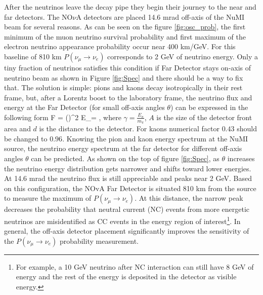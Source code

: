 After the neutrinos leave the decay pipe they begin their journey to the near and far detectors.
The NO$\nu$A detectors are placed 14.6 mrad off-axis of the NuMI beam for several reasons. As can
be seen on the figure \ref{fig:osc_prob}, the first minimum of the muon neutrino survival
probability and first maximum of the electron neutrino appearance probability occur near 400 km/GeV. 
For this baseline of 810 km $P(\nu_\mu \rightarrow \nu_e)$ corresponds
to 2 GeV of neutrino energy. Only a tiny fraction of neutrinos satisfies this condition if Far Detector 
stays on-axis of neutrino beam as shown in Figure \ref{fig:Spec} and 
there should be a way to fix that. The solution is simple: pions and kaons decay isotropically in their 
rest frame, but, after a Lorentz boost to the laboratory frame, the neutrino flux and energy at the Far 
Detector (for small off-axis angles $\theta$) can be expressed in the following form
\be
F = \Big(\Big)^2
\ee
\be
E_\nu = ,\label{EnuvsEpi}
\ee
where $\gamma = \frac{E_\pi}{m_\pi}$, $A$ is the size of the detector front area and $d$ is 
the distance to the detector. For kaons numerical factor $0.43$ should be changed to $0.96$. 
Knowing the pion and kaon energy spectrum at the NuMI source, the neutrino energy spectrum at
the far detector for different off-axis angles $\theta$ can be predicted. As shown on the top of
figure \ref{fig:Spec}, as $\theta$ increases the neutrino energy distribution gets narrower and shifts
toward lower energies. At 14.6 mrad the neutrino flux is still appreciable and peaks near 2 GeV.
Based on this configuration, the NOvA Far Detector is situated 810 km from the source to measure
the maximum of $P(\nu_\mu \rightarrow \nu_e)$. At this distance, the narrow peak decreases the
probability that neutral current (NC) events from more energetic neutrinos are misidentified
as CC events in the energy region of interest\footnote{For example, a 10 GeV neutrino after NC interaction
can still have 8 GeV of energy and the rest of the energy is deposited in the detector as visible energy.}. 
In general, the off-axis detector placement significantly improves the sensitivity of the 
$P(\nu_\mu \rightarrow \nu_e)$ probability measurement.
